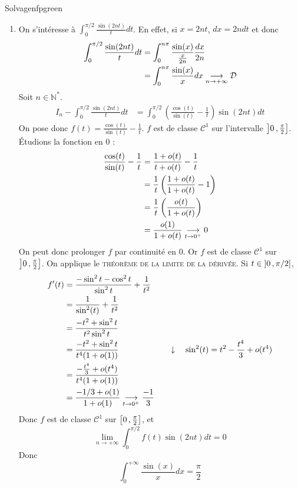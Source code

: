 \begin{demo}{Solvage}{nfpgreen}
\begin{enumerate}
            \item On s’intéresse à $\int_{0}^{\pi / 2} \frac{\sin(2nt)}{t}dt$. En effet, si $x = 2nt$, $dx = 2ndt$ et donc 
            \begin{align*}
                \int_{0}^{\pi / 2} \frac{\sin(2nt)}{t} dt 
                &= \int_{0}^{n\pi} \frac{\sin(x)}{\frac{x}{2n}} \frac{dx}{2n} \\
                &= \int_{0}^{n\pi} \frac{\sin(x)}{x} dx \underset{n \rightarrow +\infty}{\longrightarrow} \mathcal{D}
            \end{align*}
            Soit $n \in \mathbb{N}^*$.
            \begin{align*}
                I_n - \int_{0}^{\pi / 2} \frac{\sin(2nt)}{t}dt 
                &= \int_{0}^{\pi / 2} \left( \frac{\cos(t)}{\sin(t)} - \frac{1}{t} \right) \sin(2nt)dt 
            \end{align*}
            On pose donc $f(t) =  \frac{\cos(t)}{\sin(t)} - \frac{1}{t}$. $f$ est de classe $\mathcal{C}^1$ sur l’intervalle $\left] 0 \, , \frac{\pi}{2} \right]$. Étudions la fonction en $0$ :
            \begin{align*}
                \frac{\cos(t)}{\sin(t)} - \frac{1}{t} 
                &= \frac{1 + o(t)}{t + o(t)} - \frac{1}{t} \\
                &= \frac{1}{t} \left( \frac{1 + o(t)}{1 + o(t)} - 1 \right) \\
                &= \frac{1}{t} \left( \frac{o(t)}{1 + o(t)} \right) \\
                &= \frac{o(1)}{1 + o(t)} \underset{t \rightarrow 0^+}{\longrightarrow} 0
            \end{align*}
            On peut donc prolonger $f$ par continuité en $0$. Or $f$ est de classe $\mathcal{C}^1$ sur $\left] 0 \, , \frac{\pi}{2} \right]$. On applique le \textsc{théorème de la limite de la dérivée}. Si $t \in \left] 0 \, , \pi / 2 \right]$, 
            \begin{align*}
                f'(t) 
                &= \frac{-\sin^2t - \cos^2t}{\sin^2t} + \frac{1}{t^2} \\
                &= \frac{1}{\sin^2(t)} + \frac{1}{t^2} \\
                &= \frac{-t^2 + \sin^2t}{t^2 \sin^2t} \\
                &= \frac{-t^2 + \sin^2 t}{t^4 (1 + o(1))} 
                & \quad \downarrow \quad \sin^2(t) = t^2 - \frac{t^4}{3} + o(t^4) \\
                &= \frac{-\frac{t^4}{3} + o(t^4)}{t^4 (1 + o(1))} \\
                &= \frac{-1/3 + o(1)}{1 + o(1)} \underset{t \rightarrow 0^+}{\longrightarrow} \frac{-1}{3}
            \end{align*}
            Donc $f$ est de classe $\mathcal{C}^1$ sur $\left[ 0 \, , \frac{\pi}{2} \right]$, et 
            \[ \lim_{n \to +\infty} \int_{0}^{\pi / 2} f(t) \sin(2nt) dt = 0 \]   
            Donc 
            \[ \int_{0}^{+\infty} \frac{\sin(x)}{x} dx = \frac{\pi}{2} \]   
        \end{enumerate}
    \end{demo}

